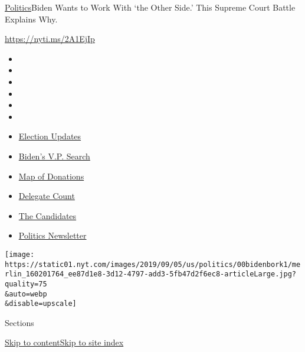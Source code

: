 \href{/section/politics}{Politics}\textbar{}Biden Wants to Work With
`the Other Side.' This Supreme Court Battle Explains Why.

\url{https://nyti.ms/2A1EjIp}

\begin{itemize}
\item
\item
\item
\item
\item
\item
\end{itemize}

\begin{itemize}
\item
  \href{https://www.nytimes.com/2020/07/31/us/elections/biden-vs-trump.html?action=click\&pgtype=Article\&state=default\&region=TOP_BANNER\&context=storylines_menu}{Election
  Updates}
\item
  \href{https://www.nytimes.com/article/biden-vice-president-2020.html?action=click\&pgtype=Article\&state=default\&region=TOP_BANNER\&context=storylines_menu}{Biden's
  V.P. Search}
\item
  \href{https://www.nytimes.com/interactive/2020/07/24/us/politics/trump-biden-campaign-donors.html?action=click\&pgtype=Article\&state=default\&region=TOP_BANNER\&context=storylines_menu}{Map
  of Donations}
\item
  \href{https://www.nytimes.com/interactive/2020/us/elections/delegate-count-primary-results.html?action=click\&pgtype=Article\&state=default\&region=TOP_BANNER\&context=storylines_menu}{Delegate
  Count}
\item
  \href{https://www.nytimes.com/interactive/2019/us/politics/2020-presidential-candidates.html?action=click\&pgtype=Article\&state=default\&region=TOP_BANNER\&context=storylines_menu}{The
  Candidates}
\item
  \href{https://www.nytimes.com/newsletters/politics?action=click\&pgtype=Article\&state=default\&region=TOP_BANNER\&context=storylines_menu}{Politics
  Newsletter}
\end{itemize}

\texttt{[image: https://static01.nyt.com/images/2019/09/05/us/politics/00bidenbork1/merlin\_160201764\_ee87d1e8-3d12-4797-add3-5fb47d2f6ec8-articleLarge.jpg?quality=75\\\&auto=webp\\\&disable=upscale]}

Sections

\protect\hyperlink{site-content}{Skip to
content}\protect\hyperlink{site-index}{Skip to site index}

